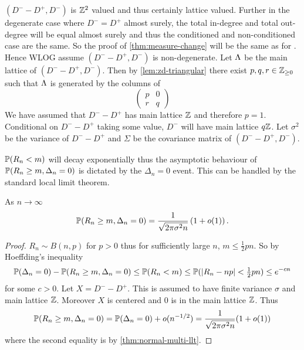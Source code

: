 $(D^- - D^+, D^-)$ is $\Z^2$ valued and thus certainly lattice valued. Further in the degenerate case where $D^- = D^+$ almost surely, the total in-degree and total out-degree will be equal almost surely and thus the conditioned and non-conditioned case are the same. So the proof of \cref{thm:measure-change} will be the same as for \cite[Proposition 4.3]{conchon--kerjanStableGraphMetric2020}. Hence WLOG assume $(D^- - D^+, D^-)$ is non-degenerate. Let $\lattice$ be the main lattice of $(D^- - D^+, D^-)$. Then by \cref{lem:zd-triangular} there exist $p, q, r \in \Z_{\geq 0}$ such that $\lattice$ is generated by the columns of
\begin{equation*}
    \begin{pmatrix}
        p & 0 \\
        r & q
    \end{pmatrix}
\end{equation*}
We have assumed that $D^- - D^+$ has main lattice $\Z$ and therefore $p = 1$. Conditional on $D^- - D^+$ taking some value, $D^-$ will have main lattice $q \Z$. Let $\sigma^2$ be the variance of $D^- - D^+$ and $\Sigma$ be the covariance matrix of $(D^- - D^+, D^-)$.

$\P(R_n < m)$ will decay exponentially thus the asymptotic behaviour of $\P(R_n \geq m, \Delta_n = 0)$ is dictated by the $\Delta_n = 0$ event. This can be handled by the standard local limit theorem.
\begin{lemma}
    \label{lem:normal-llt}
    As $n \to \infty$
    \begin{equation*}
        \P(R_n \geq m, \Delta_n = 0) = \frac{1}{\sqrt{2 \pi \sigma^2 n}} \left( 1 + \littleo(1) \right).
    \end{equation*}
\end{lemma}
\begin{proof}
    $R_n \sim B(n, p)$ for $p > 0$ thus for sufficiently large $n$, $m \leq \frac{1}{2} pn$. So by Hoeffding's inequality
    \begin{equation*}
        \P(\Delta_n = 0) - \P(R_n \geq m, \Delta_n = 0) \leq \P(R_n < m) \leq \P(\abs{R_n - np} < \tfrac{1}{2}pn) \leq e^{-cn}
    \end{equation*}
    for some $c > 0$.  Let $X = D^- - D^+$. This is assumed to have finite variance $\sigma$ and main lattice $\Z$. Moreover $X$ is centered and $0$ is in the main lattice $\Z$. Thus
    \begin{equation*}
        \P(R_n \geq m, \Delta_n = 0) = \P(\Delta_n = 0) + \littleo(n^{-1/2}) = \frac{1}{\sqrt{2 \pi \sigma^2 n}}(1 + \littleo(1))
    \end{equation*}
    where the second equality is by \cref{thm:normal-multi-llt}.
\end{proof}

